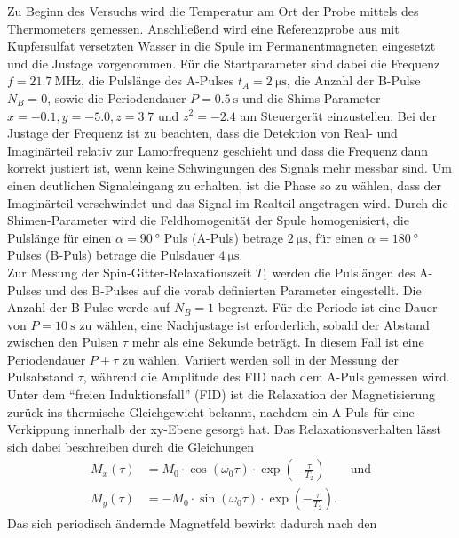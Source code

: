 \noindent Zu Beginn des Versuchs wird die Temperatur am Ort der Probe mittels
des Thermometers gemessen. Anschließend wird eine Referenzprobe aus mit
Kupfersulfat versetzten Wasser in die Spule im Permanentmagneten eingesetzt und
die Justage vorgenommen. Für die Startparameter sind dabei die Frequenz $f =
\SI{21.7}{\mega\hertz}$, die Pulslänge des A-Pulses $t_A =
\SI{2}{\micro\second}$, die Anzahl der B-Pulse $N_B = 0$, sowie die Periodendauer
$P = \SI{0.5}{\second}$ und die Shims-Parameter $x = -0.1, y = -5.0, z = 3.7$
und $z^2 = -2.4$ am Steuergerät einzustellen. Bei der Justage der Frequenz ist
zu beachten, dass die Detektion von Real- und Imaginärteil relativ zur
Lamorfrequenz geschieht und dass die Frequenz dann korrekt justiert ist, wenn
keine Schwingungen des Signals mehr messbar sind. Um einen deutlichen
Signaleingang zu erhalten, ist die Phase so zu wählen, dass der Imaginärteil
verschwindet und das Signal im Realteil angetragen wird. Durch die
Shimen-Parameter wird die Feldhomogenität der Spule homogenisiert, die Pulslänge
für einen $\alpha = \SI{90}{\degree}$ Puls (A-Puls) betrage
$\SI{2}{\micro\second}$, für einen $\alpha = \SI{180}{\degree}$ Pulses (B-Puls)
betrage die Pulsdauer $\SI{4}{\micro\second}$. \\
Zur Messung der Spin-Gitter-Relaxationszeit $T_1$ werden die Pulslängen des
A-Pulses und des B-Pulses auf die vorab definierten Parameter eingestellt.
Die Anzahl der B-Pulse werde auf $N_B = 1$ begrenzt. Für die Periode ist eine
Dauer von $P = \SI{10}{\second}$ zu wählen, eine Nachjustage ist erforderlich,
sobald der Abstand zwischen den Pulsen $\tau$ mehr als eine Sekunde beträgt. In
diesem Fall ist eine Periodendauer $P + \tau$ zu wählen. Variiert werden soll in
der Messung der Pulsabstand $\tau$, während die Amplitude des FID nach dem
A-Puls gemessen wird. \\
\noindent Unter dem \enquote{freien Induktionsfall} (FID) ist die Relaxation
der Magnetisierung zurück ins thermische Gleichgewicht bekannt, nachdem ein
A-Puls für eine Verkippung innerhalb der xy-Ebene gesorgt hat. Das
Relaxationsverhalten lässt sich dabei beschreiben durch die Gleichungen
\begin{align}
  M_x(\tau) &= M_0 \cdot \cos{(\omega_0 \tau)} \cdot \exp{\left( - \frac{\tau}{T_2}\right)} \qquad \text{und} \\
  M_y(\tau) &= - M_0 \cdot \sin{(\omega_0 \tau)} \cdot \exp{\left( - \frac{\tau}{T_2}\right)}.
\end{align}
\noindent Das sich periodisch ändernde Magnetfeld bewirkt dadurch nach den
